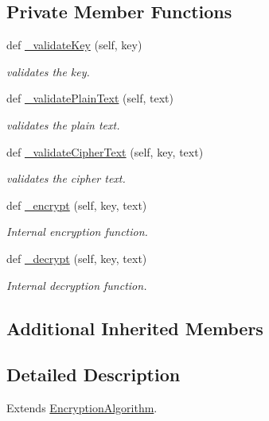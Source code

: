 \subsection*{Private Member Functions}
\begin{DoxyCompactItemize}
\item 
def \mbox{\hyperlink{classEncryptionAlgorithms_1_1SubstitutionCipher_a3ec601adf1b00d35706c42afac3d194e}{\+\_\+validate\+Key}} (self, key)
\begin{DoxyCompactList}\small\item\em validates the key. \end{DoxyCompactList}\item 
def \mbox{\hyperlink{classEncryptionAlgorithms_1_1SubstitutionCipher_a0dc91efdbee882c4b1e1fbcb2c6a8709}{\+\_\+validate\+Plain\+Text}} (self, text)
\begin{DoxyCompactList}\small\item\em validates the plain text. \end{DoxyCompactList}\item 
def \mbox{\hyperlink{classEncryptionAlgorithms_1_1SubstitutionCipher_af8725d1344b2f6dd47f1e3303ab049eb}{\+\_\+validate\+Cipher\+Text}} (self, key, text)
\begin{DoxyCompactList}\small\item\em validates the cipher text. \end{DoxyCompactList}\item 
def \mbox{\hyperlink{classEncryptionAlgorithms_1_1SubstitutionCipher_ae877efaf2ea953c760770d92d719517a}{\+\_\+encrypt}} (self, key, text)
\begin{DoxyCompactList}\small\item\em Internal encryption function. \end{DoxyCompactList}\item 
def \mbox{\hyperlink{classEncryptionAlgorithms_1_1SubstitutionCipher_ac7b54cd92d6d1c1cb5a90a9c603d50c1}{\+\_\+decrypt}} (self, key, text)
\begin{DoxyCompactList}\small\item\em Internal decryption function. \end{DoxyCompactList}\end{DoxyCompactItemize}
\subsection*{Additional Inherited Members}


\subsection{Detailed Description}
Extends \mbox{\hyperlink{classEncryptionAlgorithms_1_1EncryptionAlgorithm}{Encryption\+Algorithm}}. 

